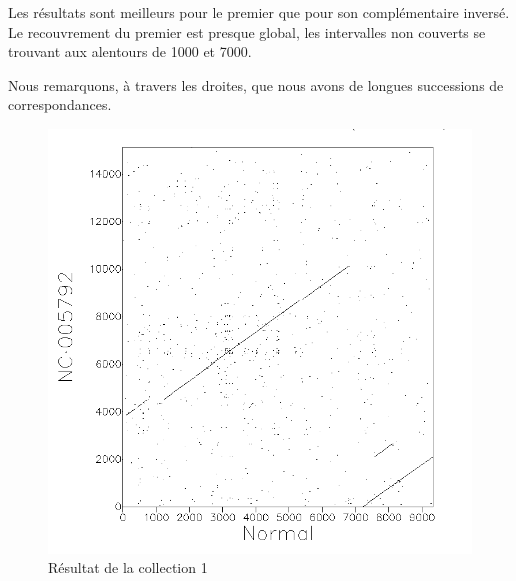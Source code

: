 Les résultats sont meilleurs pour le premier que pour son complémentaire
inversé. Le recouvrement du premier est presque global, les intervalles non
couverts se trouvant aux alentours de 1000 et 7000.

Nous remarquons, à travers les droites, que nous avons de longues successions de
correspondances.

\begin{figure}[!ht]
	\begin{minipage}[r]{.46\linewidth}
		\begin{center}
		\includegraphics[scale= 0.4]{../res/cible1.png}
		Résultat de la collection 1
	\end{center}
\end{minipage} \hfill
\begin{minipage}[c]{.46 \linewidth}
	\begin{center}

\end{center}
\end{minipage}
\end{figure}
